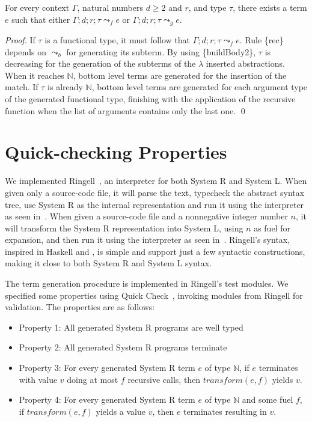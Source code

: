 \documentclass[runningheads]{llncs}
\newcommand{\tN}{\mathbb{N}}
\begin{document}
\begin{theorem}
For every context $\Gamma$, natural numbers $d \geq 2$ and $r$, and type $\tau$, there exists a term $e$ such that either ${\Gamma; d; r; \tau \leadsto_f e}$ or ${\Gamma; d; r; \tau \leadsto_g e}$.
\end{theorem}
\begin{proof}
If $\tau$ is a functional type, it must follow that 
${\Gamma; d; r; \tau \leadsto_f e}$. 
Rule \{rec\} depends on $\leadsto_b$ for generating its subterm. By 
using \{buildBody2\}, $\tau$ is decreasing for the generation of 
the subterms of the $\lambda$ inserted abstractions. When it 
reaches $\tN$, bottom level terms are generated for the insertion 
of the match. If $\tau$ is already $\tN$, bottom level terms are 
generated for each argument type of the generated functional type, 
finishing with the application of 
the recursive function when the list of arguments contains only the 
last one. \qed
\end{proof}

\section{Quick-checking Properties}
We implemented Ringell~\cite{ringell}, an 
interpreter for both System R and System L. When given only a
source-code file, it will parse the text, typecheck the abstract 
syntax tree, 
use System R as the 
internal representation and run it using the \stlc interpreter 
as seen in~\cite{plfa20.07}. 
When given a source-code file and a  
nonnegative integer number $n$, it will transform 
the System R representation into System L, using $n$ as 
fuel for expansion, and then run it using the \stlc interpreter 
as seen in~\cite{pierce2002}. Ringell's syntax, inspired in 
Haskell and \stlc, is simple and support just a few syntactic 
constructions, making it close to both System R and System L syntax.

The term generation procedure is implemented in Ringell's test modules. 
We specified some properties using Quick 
Check~\cite{sullivan08}, invoking modules from 
Ringell for validation. The properties are as follows:
\begin{itemize}
  \item Property 1: All generated System R programs are well typed
  \item Property 2: All generated System R programs terminate
  \item Property 3: For every generated System R term $e$ of 
  type $\tN$, if $e$ terminates with value $v$ doing at most 
  $f$ recursive calls, then $\mathit{transform}(e, f)$ yields $v$. 
  \item Property 4: For every generated System R term $e$ of 
  type $\tN$ and some fuel $f$, if $\mathit{transform}(e, f)$ yields 
  a value $v$, then $e$ terminates resulting in $v$.
\end{itemize}
\end{document}
